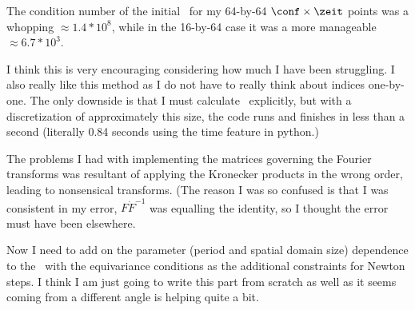 \begin{description}
{\begin{description}
The condition number of the initial \jacobianM\ for my 64-by-64 $\conf \times \zeit$ points
was a whopping $\approx 1.4 * 10^8$, while in the 16-by-64 case it was a more manageable
$\approx 6.7 * 10^3$.

I think this is very encouraging considering how much I have been struggling. I also
really like this method as I do not have to really think about indices one-by-one. The only
downside is that I must calculate \jacobianMs\ explicitly, but with a discretization of
approximately this size, the code runs and finishes in less than a second (literally 0.84 seconds
using the time feature in python.)

The problems I had with implementing the matrices governing the Fourier transforms was resultant
of applying the Kronecker products in the wrong order, leading to nonsensical transforms. (The
reason I was so confused is that I was consistent in my error, $F \dot F^{-1}$ was equalling
the identity, so I thought the error must have been elsewhere.

Now I need to add on the parameter (period and spatial domain size) dependence to the \jacobianM\
with the equivariance conditions as the additional constraints for Newton steps. I think I am
just going to write this part from scratch as well as it seems coming from a different angle is
helping quite a bit.
\end{description}
}

\end{description}
